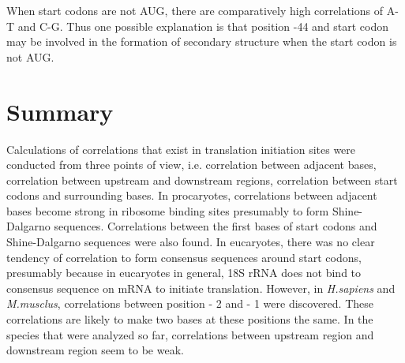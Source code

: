 When start codons are not AUG, there are comparatively high correlations 
of A-T and C-G. Thus one possible explanation is that position -44 and
start codon may be involved in the formation of secondary structure when 
the start codon is not AUG.

\section{Summary}

Calculations of correlations that exist in translation initiation sites
were conducted from three points of view, i.e. correlation between
adjacent bases, correlation between upstream and downstream regions,
correlation between start codons and surrounding bases. In procaryotes,
correlations between adjacent bases become strong in ribosome binding
sites presumably to form Shine-Dalgarno sequences.  Correlations between
the first bases of start codons and Shine-Dalgarno sequences were also
found. In eucaryotes, there was no clear tendency of correlation to form
consensus sequences around start codons, presumably because in
eucaryotes in general, 18S rRNA does not bind to consensus sequence on
mRNA to initiate translation. However, in {\it H.sapiens} and {\it
M.musclus}, correlations between position - 2 and - 1 were
discovered. These correlations are likely to make two bases at these
positions the same. In the species that were analyzed so far,
correlations between upstream region and downstream region seem to be
weak.

